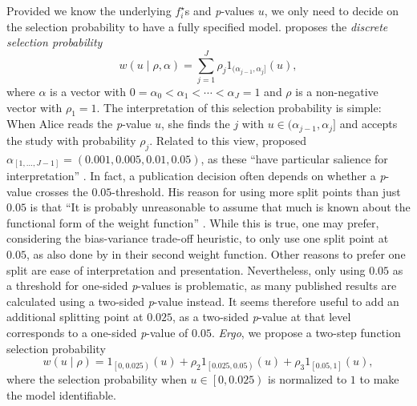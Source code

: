 \documentclass{article}
\theoremstyle{plain}
\theoremstyle{definition}
\begin{document}
Provided we know the underlying $f_{i}^{\star}$s and \textit{p}-values $u$, we only need to decide on the selection probability to have a fully specified model. \citet{hedges1992modeling} proposes the \emph{discrete selection probability}
\begin{equation}
w\left(u\mid\rho,\alpha\right)=\sum_{j=1}^{J}\rho_{j}1_{(\alpha_{j-1},\alpha_{j}]}\left(u\right),\label{eq:Weighted model step function}
\end{equation}
where $\alpha$ is a vector with $0=\alpha_{0}<\alpha_{1}<\cdots<\alpha_{J}=1$ and $\rho$ is a non-negative vector with $\rho_{1}=1$. The interpretation of this selection probability is simple: When Alice reads the \textit{p}-value $u$, she finds the $j$ with $u\in(\alpha_{j-1},\alpha_{j}]$ and accepts the study with probability $\rho_{j}$. Related to this view, \citet{hedges1992modeling} proposed $\alpha_{[1,\dots,J-1]} = \left(0.001,0.005,0.01,0.05\right)$, as these \enquote{have particular salience for interpretation} \citep{hedges1992modeling}. In fact, a publication decision often depends on whether a \textit{p}-value crosses the $0.05$-threshold. His reason for using more split points than just $0.05$ is that \enquote{It is probably unreasonable to assume that much is known about the functional form of the weight function} \citep{hedges1992modeling}. While this is true, one may prefer, considering the bias-variance trade-off heuristic, to only use one split point at $0.05$, as also done by \citet{iyengar1988selection} in their second weight function. Other reasons to prefer one split are ease of interpretation and presentation. Nevertheless, only using $0.05$ as a threshold for one-sided \textit{p}-values is problematic, as many published results are calculated using a two-sided \textit{p}-value instead. It seems therefore useful to add an additional splitting point at $0.025$, as a two-sided \textit{p}-value at that level corresponds to a one-sided \textit{p}-value of $0.05$. \emph{Ergo}, we propose a two-step function selection probability
\[
w\left(u\mid\rho\right)=1_{\left[0,0.025\right)}\left(u\right)+\rho_{2}1_{\left[0.025,0.05\right)}\left(u\right)+\rho_{3}1_{\left[0.05,1\right]}\left(u\right),
\]
where the selection probability when $u\in\left[0,0.025\right)$ is normalized to $1$ to make the model identifiable.
\end{document}
